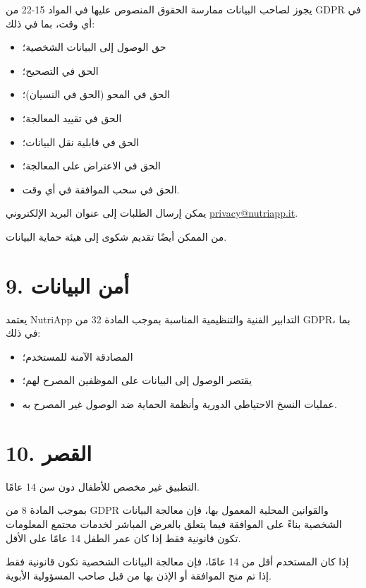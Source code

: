 \documentclass[a4paper,12pt]{article}
\begin{document}
    يجوز لصاحب البيانات ممارسة الحقوق المنصوص عليها في المواد 15-22 من GDPR في أي وقت، بما في ذلك:

    \begin{itemize}
        \item حق الوصول إلى البيانات الشخصية؛
        \item الحق في التصحيح؛
        \item الحق في المحو (الحق في النسيان)؛
        \item الحق في تقييد المعالجة؛
        \item الحق في قابلية نقل البيانات؛
        \item الحق في الاعتراض على المعالجة؛
        \item الحق في سحب الموافقة في أي وقت.
    \end{itemize}

    يمكن إرسال الطلبات إلى عنوان البريد الإلكتروني \href{mailto:privacy@nutriapp.it}{privacy@nutriapp.it}.

    من الممكن أيضًا تقديم شكوى إلى هيئة حماية البيانات.

    \section*{9. أمن البيانات}

    يعتمد NutriApp التدابير الفنية والتنظيمية المناسبة بموجب المادة 32 من GDPR، بما في ذلك:

    \begin{itemize}
        \item المصادقة الآمنة للمستخدم؛
        \item يقتصر الوصول إلى البيانات على الموظفين المصرح لهم؛
        \item عمليات النسخ الاحتياطي الدورية وأنظمة الحماية ضد الوصول غير المصرح به.
    \end{itemize}

    \section*{10. القصر}

    التطبيق غير مخصص للأطفال دون سن 14 عامًا.

    بموجب المادة 8 من GDPR والقوانين المحلية المعمول بها، فإن معالجة البيانات الشخصية بناءً على الموافقة فيما يتعلق بالعرض المباشر لخدمات مجتمع المعلومات تكون قانونية فقط إذا كان عمر الطفل 14 عامًا على الأقل.

    إذا كان المستخدم أقل من 14 عامًا، فإن معالجة البيانات الشخصية تكون قانونية فقط إذا تم منح الموافقة أو الإذن بها من قبل صاحب المسؤولية الأبوية.
\end{document}
